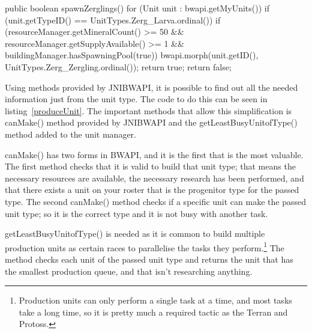 \documentclass[11pt,openright,a4paper]{report}
\begin{document}
\begin{Code}[frame=single,language=Java,breaklines,breakatwhitespace,caption={The original method used to produce a Zergling\protect\footnote{Zerglings are the basic unit of a Zerg player's army. They are small, fast, and have a melee attack}},label=spawnZergling]
public boolean spawnZerglings(){
    for (Unit unit : bwapi.getMyUnits()) {
        if (unit.getTypeID() == UnitTypes.Zerg_Larva.ordinal()) {
            if (resourceManager.getMineralCount() >= 50 && resourceManager.getSupplyAvailable() >= 1 && buildingManager.hasSpawningPool(true))
            {
                bwapi.morph(unit.getID(), UnitTypes.Zerg_Zergling.ordinal());
                return true;
            }
        }
    }
    return false;
}
\end{Code}

Using methods provided by JNIBWAPI, it is possible to find out all the needed information just from the unit type. The code to do this can be seen in listing~\ref{produceUnit}. The important methods that allow this simplification is canMake() method provided by JNIBWAPI and the getLeastBusyUnitofType() method added to the unit manager.

canMake() has two forms in BWAPI, and it is the first that is the most valuable. The first method checks that it is valid to build that unit type; that means the necessary resources are available, the necessary research has been performed, and that there exists a unit on your roster that is the progenitor type for the passed type. The second canMake() method checks if a specific unit can make the passed unit type; so it is the correct type and it is not busy with another task.

getLeastBusyUnitofType() is needed as it is common to build multiple production units as certain races to parallelise the tasks they perform.\footnote{Production units can only perform a single task at a time, and most tasks take a long time, so it is pretty much a required tactic as the Terran and Protoss.} The method checks each unit of the passed unit type and returns the unit that has the smallest production queue, and that isn't researching anything.
\end{document}

